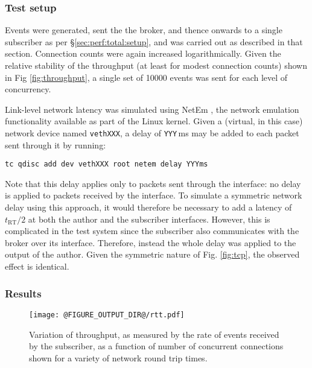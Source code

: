 \documentclass[5p,authoryear]{elsarticle}
\begin{document}
\subsubsection{Test setup}

Events were generated, sent the the broker, and thence onwards to a single
subscriber as per \S\ref{sec:perf:total:setup}, and was carried out as
described in that section. Connection counts were again increased
logarithmically.  Given the relative stability of the throughput (at least for
modest connection counts) shown in Fig \ref{fig:throughput}, a single set of
10000 events was sent for each level of concurrency.

Link-level network latency was simulated using NetEm \citep{Hemminger:2005},
the network emulation functionality available as part of the Linux kernel.
Given a (virtual, in this case) network device named \texttt{vethXXX}, a
delay of \texttt{YYY}\,ms may be added to each packet sent through it by
running:
\begin{verbatim}
tc qdisc add dev vethXXX root netem delay YYYms
\end{verbatim}
Note that this delay applies only to packets sent through the interface: no
delay is applied to packets received by the interface. To simulate a symmetric
network delay using this approach, it would therefore be necessary to add a
latency of $t_\mathrm{RT} / 2$ at both the author and the subscriber
interfaces. However, this is complicated in the test system since the
subscriber also communicates with the broker over its interface. Therefore,
instead the whole delay was applied to the output of the author. Given the
symmetric nature of Fig. \ref{fig:tcp}, the observed effect is identical.

\subsubsection{Results}

\begin{figure}
  \begin{center}
  \texttt{[image: @FIGURE\_OUTPUT\_DIR@/rtt.pdf]}
  \end{center}

  \caption{Variation of throughput, as measured by the rate of events received
  by the subscriber, as a function of number of concurrent connections shown
  for a variety of network round trip times.}

  \label{fig:rtt}
\end{figure}
\end{document}
